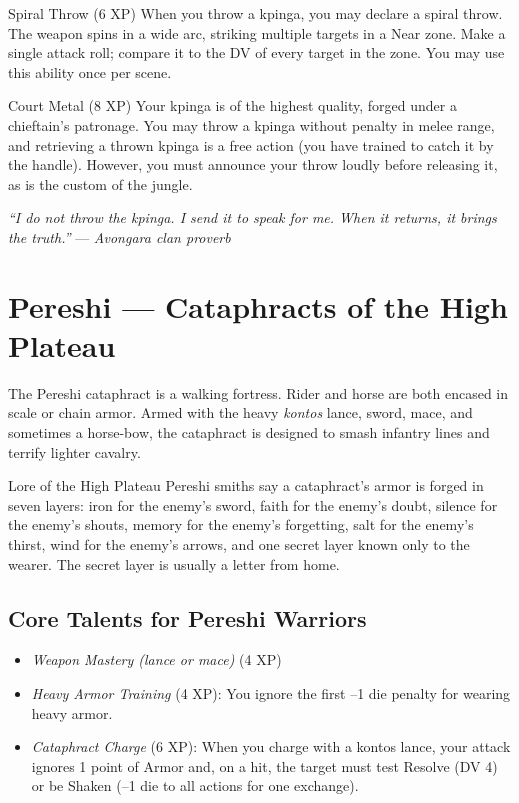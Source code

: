 \documentclass[9pt,a5paper]{extbook}
\begin{document}
\begin{talentbox}{Spiral Throw (6 XP)}
When you throw a kpinga, you may declare a spiral throw. The weapon spins in a wide arc, striking multiple targets in a Near zone. Make a single attack roll; compare it to the DV of every target in the zone. You may use this ability once per scene.
\end{talentbox}

\begin{talentbox}{Court Metal (8 XP)}
Your kpinga is of the highest quality, forged under a chieftain's patronage. You may throw a kpinga without penalty in melee range, and retrieving a thrown kpinga is a free action (you have trained to catch it by the handle). However, you must announce your throw loudly before releasing it, as is the custom of the jungle.
\end{talentbox}

\vspace{0.2cm}
\noindent\textit{``I do not throw the kpinga. I send it to speak for me. When it returns, it brings the truth.''}  
\hfill --- \textit{Avongara clan proverb}

\clearpage

\section{Pereshi --- Cataphracts of the High Plateau}

The Pereshi cataphract is a walking fortress. Rider and horse are both encased in scale or chain armor. Armed with the heavy \textit{kontos} lance, sword, mace, and sometimes a horse-bow, the cataphract is designed to smash infantry lines and terrify lighter cavalry.

\begin{warriorbox}{Lore of the High Plateau}
Pereshi smiths say a cataphract's armor is forged in seven layers: iron for the enemy's sword, faith for the enemy's doubt, silence for the enemy's shouts, memory for the enemy's forgetting, salt for the enemy's thirst, wind for the enemy's arrows, and one secret layer known only to the wearer. The secret layer is usually a letter from home.
\end{warriorbox}

\subsection{Core Talents for Pereshi Warriors}
\begin{itemize}
    \item \textit{Weapon Mastery (lance or mace)} (4 XP)
    \item \textit{Heavy Armor Training} (4 XP): You ignore the first --1 die penalty for wearing heavy armor.
    \item \textit{Cataphract Charge} (6 XP): When you charge with a kontos lance, your attack ignores 1 point of Armor and, on a hit, the target must test Resolve (DV 4) or be Shaken (--1 die to all actions for one exchange).
\end{itemize}
\end{document}
